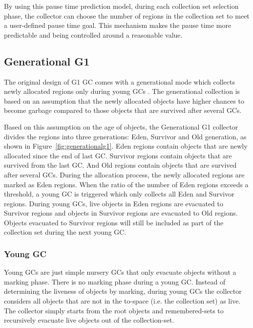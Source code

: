 By using this pause time prediction model, during each collection set selection phase,
the collector can choose the number of regions in the collection set to meet a
user-defined pause time goal. This mechanism makes the pause time more predictable
and being controlled around a reasonable value.

\subsection{Generational G1}

The original design of G1 GC comes with a generational mode which collects newly allocated regions only during young GCs \citep{detlefs2004garbage}.
The generational collection is based on an assumption that the newly allocated objects
have higher chances to become garbage compared to those objects that are survived after several GCs.

Based on this assumption on the age of objects, the Generational G1 collector divides the regions into three generations: Eden, Survivor and Old generation,
as shown in Figure~\ref{fig:generationalg1}.
Eden regions contain objects that are newly allocated since the end of last GC.
Survivor regions contain objects that are survived from the last GC.
And Old regions contain objects that are survived after several GCs.
During the allocation process, the newly allocated regions are marked as Eden regions.
When the ratio of the number of Eden regions exceeds a  threshold,
a young GC is triggered which only collects all Eden and Survivor regions.
During young GCs, live objects in Eden regions are evacuated to Survivor regions
and objects in Survivor regions are evacuated to Old regions.
Objects evacuated to Survivor regions will still be included as part of the collection set during the next young GC.

\begin{figure*}
  \centering
  \texttt{[image: \{figs/generational.pdf]}}
  \caption{Generational G1 heap structure}
  \label{fig:generationalg1}
\end{figure*}

\subsubsection{Young GC}

Young GCs are just simple nursery GCs that only evacuate objects without a marking phase.
There is no marking phase during a young GC. Instead of determining the liveness of objects
by marking, during young GCs the collector considers all objects that are not in the
to-space (i.e. the collection set) as live. The collector simply starts from the root
objects and remembered-sets to recursively evacuate live objects out of the collection-set.

